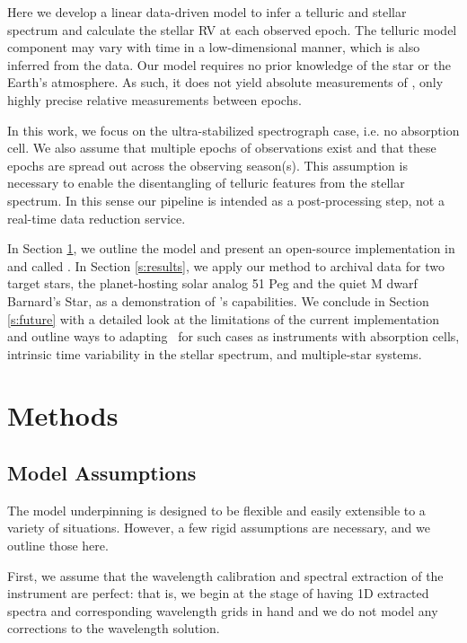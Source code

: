 \documentclass[modern]{aastex62}
\newcommand{\Mdwarf}{Barnard's Star\xspace} %
\begin{document}
Here we develop a linear data-driven model to infer a telluric and stellar spectrum and calculate the stellar RV at each observed epoch. 
The telluric model component may vary with time in a low-dimensional manner, which is also inferred from the data. 
Our model requires no prior knowledge of the star or the Earth's atmosphere. 
As such, it does not yield absolute measurements of \RVs, only highly precise relative measurements between epochs.

In this work, we focus on the ultra-stabilized spectrograph case, i.e. no absorption cell. 
We also assume that multiple epochs of observations exist and that these epochs are spread out across the observing season(s). 
This assumption is necessary to enable the disentangling of telluric features from the stellar spectrum. 
In this sense our pipeline is intended as a post-processing step, not a real-time data reduction service. 

In Section \ref{s:methods}, we outline the model and present an open-source implementation in \python and \TF called \wobble. 
In Section \ref{s:results}, we apply our method to \HARPS archival data for two target stars, the planet-hosting solar analog 51 Peg and the quiet M dwarf \Mdwarf, as a demonstration of \wobble's capabilities. 
We conclude in Section \ref{s:future} with a detailed look at the limitations of the current implementation and outline ways to adapting \wobble\ for such cases as instruments with absorption cells, intrinsic time variability in the stellar spectrum, and multiple-star systems.

\section{Methods}
\label{s:methods}
\subsection{Model Assumptions}
\label{s:assumptions}

The model underpinning \wobble is designed to be flexible and easily extensible to a variety of situations. 
However, a few rigid assumptions are necessary, and we outline those here.

First, we assume that the wavelength calibration and spectral extraction of the instrument are perfect: that is, we begin at the stage of having 1D extracted spectra and corresponding wavelength grids in hand and we do not model any corrections to the wavelength solution.
\end{document}
